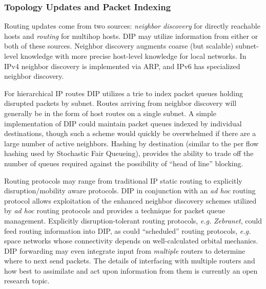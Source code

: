 \documentclass[10pt,letterpaper]{article}
\begin{document}
\subsubsection{Topology Updates and Packet Indexing}
Routing updates
come from two sources: {\em neighbor discovery} for directly reachable
hosts and {\em routing} for multihop hosts. DIP may utilize
information from either or both of these sources. Neighbor
discovery augments coarse (but scalable) subnet-level knowledge
with more precise host-level knowledge for local networks. In IPv4
neighbor discovery is implemented via ARP\cite{arp:rfc}, and IPv6
has specialized neighbor discovery\cite{4861:rfc}.

For hierarchical IP routes DIP utilizes a trie to index packet queues
holding disrupted packets by subnet. Routes arriving from neighbor
discovery will generally be in the form of host routes on a single subnet.
A simple implementation of DIP could maintain packet queues indexed by
individual destinations, though such a scheme would quickly be overwhelmed
if there are a large number of active neighbors. Hashing by destination
(similar to the per flow hashing used by Stochastic Fair Queueing),
provides the ability to trade off the number of queues required against
the possibility of ``head of line'' blocking.

Routing protocols may range from traditional IP static routing to explicitly
disruption/mobility aware protocols. DIP in conjunction with
an {\em ad hoc} routing protocol allows exploitation of
the enhanced neighbor discovery schemes utilized by {\em ad hoc}
routing protocols and provides a technique for packet queue management.
Explicitly disruption-tolerant
routing protocols, {\em e.g.} {\em Zebranet}\cite{zebranet}, could
feed routing information into DIP, as could ``scheduled'' routing
protocols, {\em e.g.} space networks whose connectivity depends on
well-calculated orbital mechanics.
DIP forwarding may even integrate input from {\em multiple} routers
to determine where to next send packets. The details of interfacing with
multiple routers and how best to assimilate and act upon information from
them is currently an open research topic.
\end{document}
